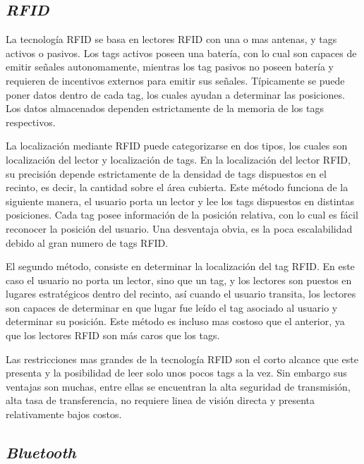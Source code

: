 \subsection{\textit{RFID}}

La tecnología RFID se basa en lectores RFID con una o mas antenas, y tags activos o pasivos. Los tags activos poseen una batería, con lo cual son capaces de emitir señales autonomamente, mientras los tag pasivos no poseen batería y requieren de incentivos externos para emitir sus señales. Típicamente se puede poner datos dentro de cada tag, los cuales ayudan a determinar las posiciones. Los datos almacenados dependen estrictamente de la memoria de los tags respectivos.

La localización mediante RFID puede categorizarse en dos tipos, los cuales son localización del lector y localización de tags. En la localización del lector RFID, su precisión depende estrictamente de la densidad de tags dispuestos en el recinto, es decir, la cantidad sobre el área cubierta. Este método funciona de la siguiente manera, el usuario porta un lector y lee los tags dispuestos en distintas posiciones. Cada tag posee información de la posición  relativa, con lo cual es fácil reconocer la posición del usuario. Una desventaja obvia, es la poca escalabilidad debido al gran numero de tags RFID. 

El segundo método, consiste en determinar la localización del tag RFID. En este caso el usuario no porta un lector, sino que un tag, y los lectores son puestos en lugares estratégicos dentro del recinto, así cuando el usuario transita, los lectores son capaces de determinar en que lugar fue leído el tag asociado al usuario y determinar su posición. Este método es incluso mas costoso que el anterior, ya que los lectores RFID son más caros que los tags. 

Las restricciones mas grandes de la tecnología RFID son el corto alcance que este presenta y la posibilidad de leer solo unos pocos tags a la vez. Sin embargo sus ventajas son muchas, entre ellas se encuentran la alta seguridad de transmisión, alta tasa de transferencia, no requiere linea de visión directa y presenta relativamente bajos costos. 

\subsection{\textit{Bluetooth}}

